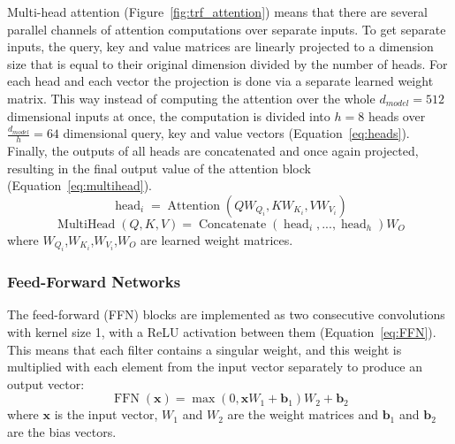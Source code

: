 \documentclass[12pt]{article}
\DeclareMathOperator{\Attention}{Attention}
\DeclareMathOperator{\MultiHead}{MultiHead}
\DeclareMathOperator{\Concatenate}{Concatenate}
\DeclareMathOperator{\head}{head}
\DeclareMathOperator{\FFN}{FFN}
\begin{document}
Multi-head attention (Figure~\ref{fig:trf_attention}) means that there are several parallel channels of attention computations over separate inputs. To get separate inputs, the query, key and value matrices are linearly projected to a dimension size that is equal to their original dimension divided by the number of heads. For each head and each vector the projection is done via a separate learned weight matrix. This way instead of computing the attention over the whole \(d_{model}=512\) dimensional inputs at once, the computation is divided into \(h=8\) heads over \(\frac{d_{model}}{h}=64\) dimensional query, key and value vectors (Equation~\ref{eq:heads}). Finally, the outputs of all heads are concatenated and once again projected, resulting in the final output value of the attention block (Equation~\ref{eq:multihead}).
\begin{equation}\label{eq:heads}
\head_i=\Attention(QW_{Q_i},KW_{K_i},VW_{V_i})
\end{equation}
\begin{equation} \label{eq:multihead}
\MultiHead(Q,K,V)=\Concatenate(\head_i,...,\head_h)W_O
\end{equation}
where \(W_{Q_i}\),\(W_{K_i}\),\(W_{V_i}\),\(W_{O}\) are learned weight matrices.

\subsubsection{Feed-Forward Networks} \label{sssec:trf_nn}
The feed-forward (FFN) blocks are implemented as two consecutive convolutions with kernel size 1, with a ReLU activation between them (Equation~\ref{eq:FFN}). This means that each filter contains a singular weight, and this weight is multiplied with each element from the input vector separately to produce an output vector:
\begin{equation} \label{eq:FFN}
\FFN(\bm{x})=\max(0,\bm{x}W_1+\bm{b}_1)W_2+\bm{b}_2
\end{equation}
where \(\bm{x}\) is the input vector, \(W_1\) and \(W_2\) are the weight matrices and \(\bm{b}_1\) and \(\bm{b}_2\) are the bias vectors.
\end{document}
